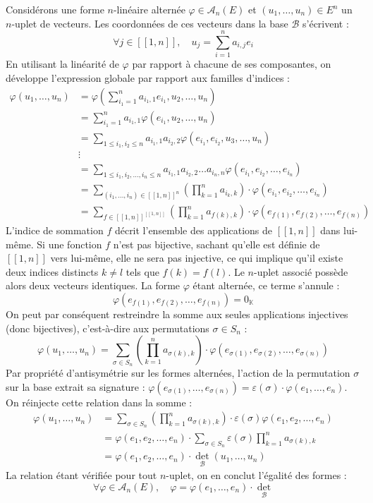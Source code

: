 \documentclass[11pt, a4paper]{article}
\theoremstyle{definition}
\begin{document}
Considérons une forme $n$-linéaire alternée $\varphi \in \mathscr A_n(E)$ et $(u_1, \dots, u_n) \in E^n$ un $n$-uplet de vecteurs. Les coordonnées de ces vecteurs dans la base $\mathcal{B}$ s'écrivent :
$$\forall j \in [\![1,n]\!], \quad u_j = \sum_{i=1}^n a_{i,j} e_i$$
En utilisant la linéarité de $\varphi$ par rapport à chacune de ses composantes, on développe l'expression globale par rapport aux familles d'indices :
\begin{align*}
	\varphi(u_1,\dots,u_n) &= \varphi\left(\sum_{i_1=1}^n a_{i_1,1} e_{i_1}, u_2, \dots, u_n\right) \\
	&= \sum_{i_1=1}^n a_{i_1,1} \varphi(e_{i_1}, u_2, \dots, u_n) \\
	&= \sum_{1 \le i_1, i_2 \le n} a_{i_1,1} a_{i_2,2} \varphi(e_{i_1}, e_{i_2}, u_3, \dots, u_n) \\
	&\vdots \\
	&= \sum_{1 \le i_1, i_2, \dots, i_n \le n} a_{i_1,1} a_{i_2,2} \dots a_{i_n,n} \varphi(e_{i_1}, e_{i_2}, \dots, e_{i_n}) \\
	&= \sum_{(i_1,\dots,i_n) \in [\![1,n]\!]^n} \left(\prod_{k=1}^n a_{i_k,k}\right) \cdot \varphi(e_{i_1}, e_{i_2}, \dots, e_{i_n}) \\
	&= \sum_{f \in [\![1,n]\!]^{[\![1,n]\!]}} \left(\prod_{k=1}^n a_{f(k),k}\right) \cdot \varphi(e_{f(1)}, e_{f(2)}, \dots, e_{f(n)})
\end{align*}
L'indice de sommation $f$ décrit l'ensemble des applications de $[\![1,n]\!]$ dans lui-même. Si une fonction $f$ n'est pas bijective, sachant qu'elle est définie de $[\![1,n]\!]$ vers lui-même, elle ne sera pas injective, ce qui implique qu'il existe deux indices distincts $k \ne l$ tels que $f(k) = f(l)$. Le $n$-uplet associé possède alors deux vecteurs identiques. La forme $\varphi$ étant alternée, ce terme s'annule :
$$\varphi(e_{f(1)}, e_{f(2)}, \dots, e_{f(n)}) = 0_\mathbb{K}$$
On peut par conséquent restreindre la somme aux seules applications injectives (donc bijectives), c'est-à-dire aux permutations $\sigma \in S_n$ :
$$\varphi(u_1,\dots,u_n) = \sum_{\sigma \in S_n} \left(\prod_{k=1}^n a_{\sigma(k),k}\right) \cdot \varphi(e_{\sigma(1)}, e_{\sigma(2)}, \dots, e_{\sigma(n)})$$
Par propriété d'antisymétrie sur les formes alternées, l'action de la permutation $\sigma$ sur la base extrait sa signature : $\varphi(e_{\sigma(1)}, \dots, e_{\sigma(n)}) = \varepsilon(\sigma) \cdot \varphi(e_1, \dots, e_n)$. On réinjecte cette relation dans la somme :
\begin{align*}
	\varphi(u_1,\dots,u_n) &= \sum_{\sigma \in S_n} \left(\prod_{k=1}^n a_{\sigma(k),k}\right) \cdot \varepsilon(\sigma) \varphi(e_1, e_2, \dots, e_n) \\
	&= \varphi(e_1, e_2, \dots, e_n) \cdot \sum_{\sigma \in S_n} \varepsilon(\sigma) \prod_{k=1}^n a_{\sigma(k),k} \\
	&= \varphi(e_1, e_2, \dots, e_n) \cdot \det_{\mathcal{B}}(u_1, \dots, u_n)
\end{align*}
La relation étant vérifiée pour tout $n$-uplet, on en conclut l'égalité des formes :
$$\forall \varphi \in \mathscr A_n(E), \quad \varphi = \varphi(e_1, \dots, e_n) \cdot \det_{\mathcal{B}}$$
\end{document}
